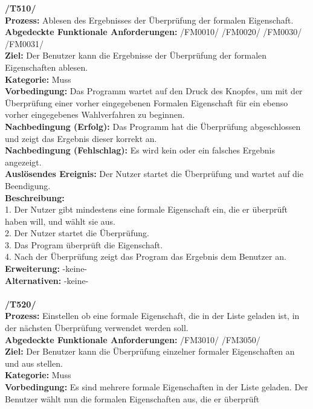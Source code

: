 \documentclass[a4paper]{scrreprt}
\begin{document}
\textbf{/T510/}\\
\textbf{Prozess: }Ablesen des Ergebnisses der Überprüfung der formalen Eigenschaft. \\
\textbf{Abgedeckte Funktionale Anforderungen:} /FM0010/ /FM0020/ /FM0030/ /FM0031/ \\
\textbf{Ziel:} Der Benutzer kann die Ergebnisse der Überprüfung der formalen
Eigenschaften ablesen.\\
\textbf{Kategorie:} Muss\\
\textbf{Vorbedingung:} Das Programm wartet auf den Druck des Knopfes, um mit
der Überprüfung einer vorher eingegebenen Formalen Eigenschaft für ein ebenso
vorher eingegebenes Wahlverfahren zu beginnen.\\
\textbf{Nachbedingung (Erfolg):} Das Programm hat die Überprüfung abgeschlossen
und zeigt das Ergebnis dieser korrekt an.\\
\textbf{Nachbedingung (Fehlschlag):} Es wird kein oder ein falsches Ergebnis
angezeigt.\\
\textbf{Auslösendes Ereignis:} Der Nutzer startet die Überprüfung und wartet
auf die Beendigung.	\\
\textbf{Beschreibung:} \\
1. Der Nutzer gibt mindestens eine formale Eigenschaft ein, die er überprüft
haben will, und wählt sie aus. \\
2. Der Nutzer startet die Überprüfung.\\
3. Das Program überprüft die Eigenschaft. \\
4. Nach der Überprüfung zeigt das Program das Ergebnis dem Benutzer an. \\
\textbf {Erweiterung:} -keine- \\
\textbf {Alternativen:} -keine- \\\\
\textbf{/T520/}\\
\textbf{Prozess: }Einstellen ob eine formale Eigenschaft, die in der Liste geladen ist, in der nächsten Überprüfung verwendet werden soll. \\
\textbf{Abgedeckte Funktionale Anforderungen:} /FM3010/ /FM3050/ \\
\textbf{Ziel:} Der Benutzer kann die Überprüfung einzelner formaler
Eigenschaften an und aus stellen.\\
\textbf{Kategorie:} Muss\\
\textbf{Vorbedingung:} Es sind mehrere formale Eigenschaften in der Liste
geladen. Der Benutzer wählt nun die formalen Eigenschaften aus, die er überprüft
\end{document}
